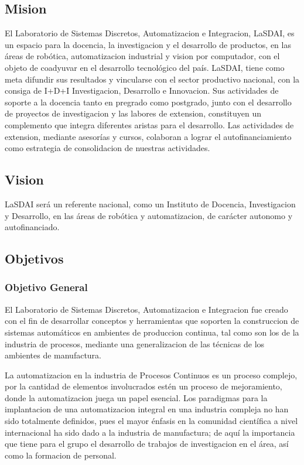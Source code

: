 \subsection{Mision}

El Laboratorio de Sistemas Discretos, Automatizacion e Integracion, LaSDAI, es un espacio para la docencia, la investigacion y el desarrollo de productos, en las áreas de robótica, automatizacion industrial y vision por computador, con el objeto de coadyuvar en el desarrollo tecnológico del país.
LaSDAI, tiene como meta difundir sus resultados  y vincularse con el sector productivo nacional, con la consiga de I+D+I Investigacion, Desarrollo e Innovacion. Sus actividades de soporte a la docencia tanto en pregrado como postgrado, junto con el desarrollo de proyectos de investigacion y las labores de extension, constituyen un complemento que integra diferentes aristas para el desarrollo. Las actividades de extension, mediante asesorías y cursos, colaboran a lograr el autofinanciamiento como estrategia de consolidacion de nuestras actividades.

\subsection{Vision}

LaSDAI será un referente nacional, como un Instituto de Docencia, Investigacion y Desarrollo, en las áreas de robótica y automatizacion, de carácter autonomo y autofinanciado.

\subsection{Objetivos}

\subsubsection{Objetivo General}

El Laboratorio de Sistemas Discretos, Automatizacion e Integracion fue creado con el fin de desarrollar conceptos y herramientas que soporten la construccion de sistemas automáticos en ambientes de produccion continua, tal como son los de la industria de procesos, mediante una generalizacion de las técnicas de los ambientes de manufactura.

La automatizacion en la industria de Procesos Continuos es un proceso complejo, por la cantidad de elementos involucrados estén un proceso de mejoramiento, donde la automatizacion juega un papel esencial. Los paradigmas para la implantacion de una automatizacion integral en una industria compleja no han sido totalmente definidos, pues el mayor énfasis en la comunidad científica a nivel internacional ha sido dado a la industria de manufactura; de aquí la importancia que tiene para el grupo el desarrollo de trabajos de investigacion en el área, así como la formacion de personal.

